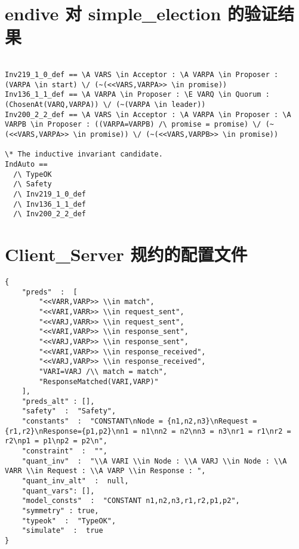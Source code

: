 \appendix
\chapter{endive 对 simple\_election 的验证结果}\label{app:endive_simple_election}
\begin{lstlisting}
  
Inv219_1_0_def == \A VARS \in Acceptor : \A VARPA \in Proposer : (VARPA \in start) \/ (~(<<VARS,VARPA>> \in promise))
Inv136_1_1_def == \A VARPA \in Proposer : \E VARQ \in Quorum : (ChosenAt(VARQ,VARPA)) \/ (~(VARPA \in leader))
Inv200_2_2_def == \A VARS \in Acceptor : \A VARPA \in Proposer : \A VARPB \in Proposer : ((VARPA=VARPB) /\ promise = promise) \/ (~(<<VARS,VARPA>> \in promise)) \/ (~(<<VARS,VARPB>> \in promise))

\* The inductive invariant candidate.
IndAuto ==
  /\ TypeOK
  /\ Safety
  /\ Inv219_1_0_def
  /\ Inv136_1_1_def
  /\ Inv200_2_2_def
\end{lstlisting}

\chapter{Client\_Server 规约的配置文件}\label{app:client_server_config}
\begin{lstlisting}
{
    "preds"  :  [
        "<<VARR,VARP>> \\in match",
        "<<VARI,VARR>> \\in request_sent",
        "<<VARJ,VARR>> \\in request_sent",
        "<<VARI,VARP>> \\in response_sent",
        "<<VARJ,VARP>> \\in response_sent",
        "<<VARI,VARP>> \\in response_received",
        "<<VARJ,VARP>> \\in response_received",
        "VARI=VARJ /\\ match = match",
        "ResponseMatched(VARI,VARP)"
    ],
    "preds_alt" : [],
    "safety"  :  "Safety",
    "constants"  :  "CONSTANT\nNode = {n1,n2,n3}\nRequest = {r1,r2}\nResponse={p1,p2}\nn1 = n1\nn2 = n2\nn3 = n3\nr1 = r1\nr2 = r2\np1 = p1\np2 = p2\n",
    "constraint"  :  "",
    "quant_inv"  :  "\\A VARI \\in Node : \\A VARJ \\in Node : \\A VARR \\in Request : \\A VARP \\in Response : ",
    "quant_inv_alt"  :  null,
    "quant_vars": [],
    "model_consts"  :  "CONSTANT n1,n2,n3,r1,r2,p1,p2",
    "symmetry" : true,
    "typeok"  :  "TypeOK",
    "simulate"  :  true      
}
\end{lstlisting}
